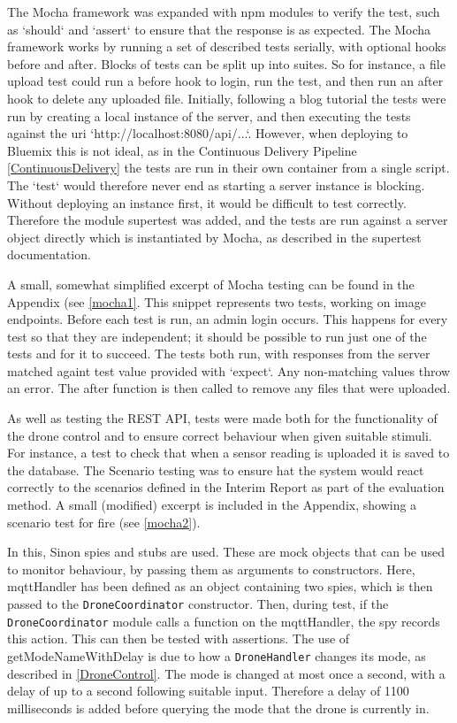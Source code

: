 \documentclass{article}
\begin{document}
The Mocha framework was expanded with npm modules to verify the test, such as `should` and `assert` to ensure that the response is as expected. The Mocha framework works by running a set of described tests serially, with optional hooks before and after. Blocks of tests can be split up into suites. So for instance, a file upload test could run a before hook to login, run the test, and then run an after hook to delete any uploaded file. Initially, following a blog tutorial\cite{thewayofcode} the tests were run by creating a local instance of the server, and then executing the tests against the uri `http://localhost:8080/api/...`. However, when deploying to Bluemix this is not ideal, as in the Continuous Delivery Pipeline \ref{ContinuousDelivery} the tests are run in their own container from a single script. The `test` would therefore never end as starting a server instance is blocking. Without deploying an instance first, it would be difficult to test correctly. Therefore the module supertest was added, and the tests are run against a server object directly which is instantiated by Mocha, as described in the supertest documentation\cite{supertest}.

A small, somewhat simplified excerpt of Mocha testing can be found in the Appendix (see \ref{mocha1}. This snippet represents two tests, working on image endpoints. Before each test is run, an admin login occurs. This happens for every test so that they are independent; it should be possible to run just one of the tests and for it to succeed. The tests both run, with responses from the server matched againt test value provided with `expect`. Any non-matching values throw an error. The after function is then called to remove any files that were uploaded.  

As well as testing the REST API, tests were made both for the functionality of the drone control and to ensure correct behaviour when given suitable stimuli. For instance, a test to check that when a sensor reading is uploaded it is saved to the database. The Scenario testing was to ensure hat the system would react correctly to the scenarios defined in the Interim Report as part of the evaluation method. A small (modified) excerpt is included in the Appendix, showing a scenario test for fire (see \ref{mocha2}).

In this, Sinon spies and stubs are used\cite{sinon}. These are mock objects that can be used to monitor behaviour, by passing them as arguments to constructors. Here, mqttHandler has been defined as an object containing two spies, which is then passed to the \texttt{DroneCoordinator} constructor. Then, during test, if the \texttt{DroneCoordinator} module calls a function on the mqttHandler, the spy records this action. This can then be tested with assertions. The use of getModeNameWithDelay is due to how a \texttt{DroneHandler} changes its mode, as described in \ref{DroneControl}. The mode is changed at most once a second, with a delay of up to a second following suitable input. Therefore a delay of 1100 milliseconds is added before querying the mode that the drone is currently in.
\end{document}
